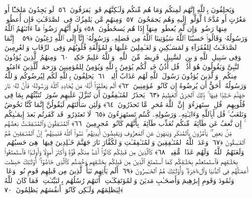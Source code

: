 وَيَحلِفُونَ بِٱللَّهِ إِنَّهُم لَمِنكُم وَمَا هُم مِّنكُم وَلَـٰكِنَّهُم قَومٌۭ يَفرَقُونَ ﴿٥٦﴾
 لَو يَجِدُونَ مَلجَـًٔا أَو مَغَٰرَٰتٍ أَو مُدَّخَلًۭا لَّوَلَّوا۟ إِلَيهِ وَهُم يَجمَحُونَ ﴿٥٧﴾
 وَمِنهُم مَّن يَلمِزُكَ فِى ٱلصَّدَقَـٰتِ فَإِن أُعطُوا۟ مِنهَا رَضُوا۟ وَإِن لَّم يُعطَوا۟ مِنهَآ إِذَا هُم يَسخَطُونَ ﴿٥٨﴾
 وَلَو أَنَّهُم رَضُوا۟ مَآ ءَاتَىٰهُمُ ٱللَّهُ وَرَسُولُهُۥ وَقَالُوا۟ حَسبُنَا ٱللَّهُ سَيُؤتِينَا ٱللَّهُ مِن فَضلِهِۦ وَرَسُولُهُۥٓ إِنَّآ إِلَى ٱللَّهِ رَٰغِبُونَ ﴿٥٩﴾
 ۞ إِنَّمَا ٱلصَّدَقَـٰتُ لِلفُقَرَآءِ وَٱلمَسَـٰكِينِ وَٱلعَـٰمِلِينَ عَلَيهَا وَٱلمُؤَلَّفَةِ قُلُوبُهُم وَفِى ٱلرِّقَابِ وَٱلغَٰرِمِينَ وَفِى سَبِيلِ ٱللَّهِ وَٱبنِ ٱلسَّبِيلِ ۖ فَرِيضَةًۭ مِّنَ ٱللَّهِ ۗ وَٱللَّهُ عَلِيمٌ حَكِيمٌۭ ﴿٦٠﴾
 وَمِنهُمُ ٱلَّذِينَ يُؤذُونَ ٱلنَّبِىَّ وَيَقُولُونَ هُوَ أُذُنٌۭ ۚ قُل أُذُنُ خَيرٍۢ لَّكُم يُؤمِنُ بِٱللَّهِ وَيُؤمِنُ لِلمُؤمِنِينَ وَرَحمَةٌۭ لِّلَّذِينَ ءَامَنُوا۟ مِنكُم ۚ وَٱلَّذِينَ يُؤذُونَ رَسُولَ ٱللَّهِ لَهُم عَذَابٌ أَلِيمٌۭ ﴿٦١﴾
 يَحلِفُونَ بِٱللَّهِ لَكُم لِيُرضُوكُم وَٱللَّهُ وَرَسُولُهُۥٓ أَحَقُّ أَن يُرضُوهُ إِن كَانُوا۟ مُؤمِنِينَ ﴿٦٢﴾
 أَلَم يَعلَمُوٓا۟ أَنَّهُۥ مَن يُحَادِدِ ٱللَّهَ وَرَسُولَهُۥ فَأَنَّ لَهُۥ نَارَ جَهَنَّمَ خَـٰلِدًۭا فِيهَا ۚ ذَٟلِكَ ٱلخِزىُ ٱلعَظِيمُ ﴿٦٣﴾
 يَحذَرُ ٱلمُنَـٰفِقُونَ أَن تُنَزَّلَ عَلَيهِم سُورَةٌۭ تُنَبِّئُهُم بِمَا فِى قُلُوبِهِم ۚ قُلِ ٱستَهزِءُوٓا۟ إِنَّ ٱللَّهَ مُخرِجٌۭ مَّا تَحذَرُونَ ﴿٦٤﴾
 وَلَئِن سَأَلتَهُم لَيَقُولُنَّ إِنَّمَا كُنَّا نَخُوضُ وَنَلعَبُ ۚ قُل أَبِٱللَّهِ وَءَايَـٰتِهِۦ وَرَسُولِهِۦ كُنتُم تَستَهزِءُونَ ﴿٦٥﴾
 لَا تَعتَذِرُوا۟ قَد كَفَرتُم بَعدَ إِيمَـٰنِكُم ۚ إِن نَّعفُ عَن طَآئِفَةٍۢ مِّنكُم نُعَذِّب طَآئِفَةًۢ بِأَنَّهُم كَانُوا۟ مُجرِمِينَ ﴿٦٦﴾
 ٱلمُنَـٰفِقُونَ وَٱلمُنَـٰفِقَـٰتُ بَعضُهُم مِّنۢ بَعضٍۢ ۚ يَأمُرُونَ بِٱلمُنكَرِ وَيَنهَونَ عَنِ ٱلمَعرُوفِ وَيَقبِضُونَ أَيدِيَهُم ۚ نَسُوا۟ ٱللَّهَ فَنَسِيَهُم ۗ إِنَّ ٱلمُنَـٰفِقِينَ هُمُ ٱلفَـٰسِقُونَ ﴿٦٧﴾
 وَعَدَ ٱللَّهُ ٱلمُنَـٰفِقِينَ وَٱلمُنَـٰفِقَـٰتِ وَٱلكُفَّارَ نَارَ جَهَنَّمَ خَـٰلِدِينَ فِيهَا ۚ هِىَ حَسبُهُم ۚ وَلَعَنَهُمُ ٱللَّهُ ۖ وَلَهُم عَذَابٌۭ مُّقِيمٌۭ ﴿٦٨﴾
 كَٱلَّذِينَ مِن قَبلِكُم كَانُوٓا۟ أَشَدَّ مِنكُم قُوَّةًۭ وَأَكثَرَ أَموَٟلًۭا وَأَولَـٰدًۭا فَٱستَمتَعُوا۟ بِخَلَـٰقِهِم فَٱستَمتَعتُم بِخَلَـٰقِكُم كَمَا ٱستَمتَعَ ٱلَّذِينَ مِن قَبلِكُم بِخَلَـٰقِهِم وَخُضتُم كَٱلَّذِى خَاضُوٓا۟ ۚ أُو۟لَـٰٓئِكَ حَبِطَت أَعمَـٰلُهُم فِى ٱلدُّنيَا وَٱلءَاخِرَةِ ۖ وَأُو۟لَـٰٓئِكَ هُمُ ٱلخَـٰسِرُونَ ﴿٦٩﴾
 أَلَم يَأتِهِم نَبَأُ ٱلَّذِينَ مِن قَبلِهِم قَومِ نُوحٍۢ وَعَادٍۢ وَثَمُودَ وَقَومِ إِبرَٰهِيمَ وَأَصحَـٰبِ مَديَنَ وَٱلمُؤتَفِكَـٰتِ ۚ أَتَتهُم رُسُلُهُم بِٱلبَيِّنَـٰتِ ۖ فَمَا كَانَ ٱللَّهُ لِيَظلِمَهُم وَلَـٰكِن كَانُوٓا۟ أَنفُسَهُم يَظلِمُونَ ﴿٧٠﴾

